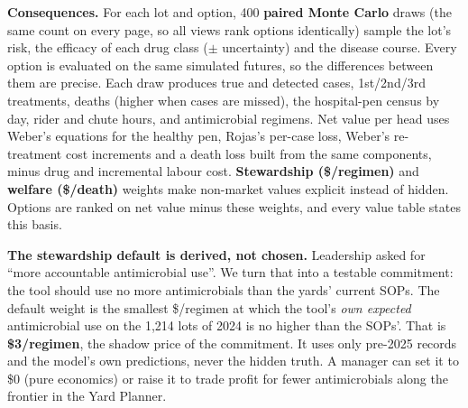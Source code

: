 \documentclass[10pt,letterpaper]{article}
\newcommand{\usd}[1]{\$#1}
\newcommand{\lead}[1]{\textbf{#1}\enspace}
\begin{document}
\lead{Consequences.} For each lot and option, 400 \textbf{paired Monte Carlo} draws (the same count on every page, so all views rank options identically) sample the lot's risk, the efficacy of each drug class ($\pm$ uncertainty) and the disease course. Every option is evaluated on the same simulated futures, so the differences between them are precise. Each draw produces true and detected cases, 1st/2nd/3rd treatments, deaths (higher when cases are missed), the hospital-pen census by day, rider and chute hours, and antimicrobial regimens. Net value per head uses Weber's equations for the healthy pen, Rojas's per-case loss, Weber's re-treatment cost increments and a death loss built from the same components, minus drug and incremental labour cost. \textbf{Stewardship (\$/regimen)} and \textbf{welfare (\$/death)} weights make non-market values explicit instead of hidden. Options are ranked on net value minus these weights, and every value table states this basis.

\lead{The stewardship default is derived, not chosen.} Leadership asked for ``more accountable antimicrobial use''. We turn that into a testable commitment: the tool should use no more antimicrobials than the yards' current SOPs. The default weight is the smallest \$/regimen at which the tool's \emph{own expected} antimicrobial use on the 1,214 lots of 2024 is no higher than the SOPs'. That is \textbf{\usd{3}/regimen}, the shadow price of the commitment. It uses only pre-2025 records and the model's own predictions, never the hidden truth. A manager can set it to \usd{0} (pure economics) or raise it to trade profit for fewer antimicrobials along the frontier in the Yard Planner.
\end{document}
